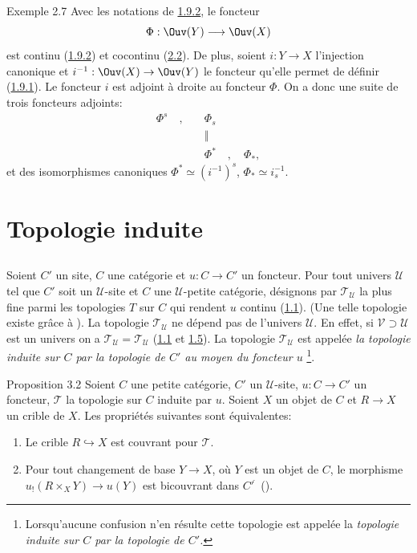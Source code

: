 \documentclass[10pt]{../fichiers-configuration-latex/smfart}
\begin{document}
\begin{enonce*}[remark]{Exemple 2.7}
Avec les notations de \hyperref[III.exem1.9.2]{1.9.2}, le foncteur
$$
\Phi:\Ouv(Y)\longrightarrow \Ouv(X)
$$
est continu (\hyperref[III.exem1.9.2]{1.9.2}) et cocontinu (\hyperref[III.prop2.2]{2.2}).
De plus, soient $i:Y\rightarrow X$ l'injection\pageoriginale
canonique et $i^{-1}:\Ouv(X)\rightarrow \Ouv(Y)$ le foncteur qu'elle
permet de définir (\hyperref[III.exem1.9.1]{1.9.1}). Le foncteur $i$ est
adjoint à droite au foncteur $\Phi$. On a donc une suite de trois
foncteurs adjoints:
\begin{align*}
\Phi^s\quad ,\quad & \Phi_s\\
        & ‖\\
        &\Phi^{\ast}\quad,\quad \Phi_{\ast},
\end{align*}
et des isomorphismes canoniques $\Phi^{\ast}\simeq (i^{-1})^s$,
$\Phi_{\ast}\simeq i^{-1}_s$.
\end{enonce*}

\section{Topologie induite}

\subsection{}
Soient $C'$ un site, $C$ une catégorie et $u:C\rightarrow C'$ un
foncteur. Pour tout univers $𝒰$ tel que $C'$ soit un
$𝒰$-site et $C$ une $𝒰$-petite catégorie, désignons
par $𝒯_{𝒰}$ la plus fine parmi les topologies $T$ sur $C$
qui rendent $u$ continu (\hyperref[III.def1.1]{1.1}). (Une telle topologie
existe grâce à ). La topologie $𝒯_{𝒰}$ ne
dépend pas de l'univers $𝒰$. En effet, si $𝒱\supset
𝒰$ est un univers on a $𝒯_{𝒰}=𝒯_{𝒰}$
(\hyperref[III.def1.1]{1.1} et \hyperref[III.prop1.5]{1.5}). La topologie
$𝒯_{𝒰}$ est appelée \emph{la topologie
  induite sur $C$ par la topologie de $C'$ au moyen du foncteur $u$}
  \footnote[1]{Lorsqu'aucune confusion n'en résulte cette topologie
    est appelée la \emph{topologie induite sur $C$ par la topologie
      de $C'$.}}.

\begin{enonce*}{Proposition 3.2}
Soient $C$ une petite catégorie, $C'$ un $𝒰$-site,
$u:C\rightarrow C'$ un foncteur, $𝒯$ la topologie sur $C$ induite
par $u$. Soient $X$ un objet de $C$ et $R\rightarrow X$ un crible de
$X$. Les propriétés suivantes sont équivalentes:
\begin{enumerate}
\renewcommand{\theenumi}{\roman{enumi}}
\renewcommand{\labelenumi}{\theenumi)}
\item Le crible $R\hookrightarrow X$ est couvrant pour $𝒯$.

\item Pour tout changement de base $Y\rightarrow X$, où $Y$ est un
  objet de $C$, le morphisme $u_{!}(R\times_X Y)\rightarrow u(Y)$ est
  bicouvrant dans ${C'}^{\widehat{\phantom{,}}}$ {\rm ().}
\end{enumerate}
\end{enonce*}
\end{document}
